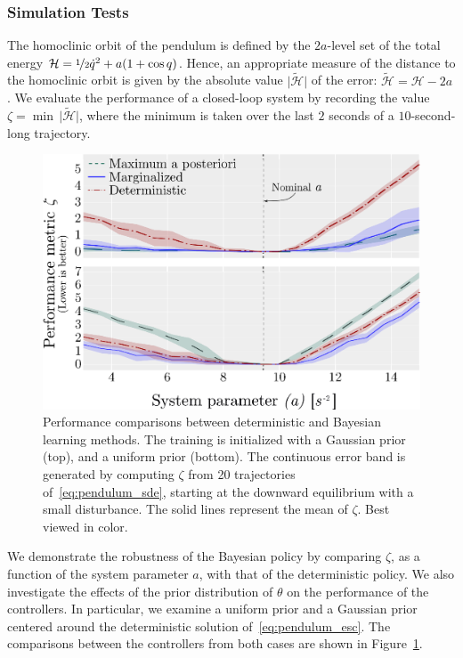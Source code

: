 \subsubsection{Simulation Tests} 
The homoclinic orbit of the pendulum is defined by the $2a$-level set of the
total energy $\mathcal{H} = \nicefrac{1}{2}\dot{q}^2 + a(1 +
\cos{q})$. Hence, an appropriate measure of the distance to the
homoclinic orbit is given by the absolute value $\bigl| \mathcal{\tilde{H}}
\bigr|$ of the error: $\mathcal{\tilde{H}} = \mathcal{H} - 2a$. We evaluate the
performance of a closed-loop system by recording the value $\zeta = \min \,
\bigl| \mathcal{\tilde{H}} \bigr|$, where the minimum is taken over the last $2$
seconds of a $10$-second-long trajectory.
\begin{figure}[tb]
    \centering
    \includegraphics[width=0.8\linewidth]{figures/H_combined.eps}
    \caption{
        Performance comparisons between deterministic and Bayesian learning
        methods. 
        The training is initialized with a Gaussian prior (top), and a
        uniform prior (bottom). 
        The continuous error band is generated by computing $\zeta$ from 20
        trajectories of~\eqref{eq:pendulum_sde}, starting at the downward
        equilibrium with a small disturbance. 
        The solid lines represent the mean of $\zeta$. 
        Best viewed in color.
    }
    \label{fig:bayes_compare}
\end{figure}

We demonstrate the robustness of the Bayesian policy by comparing $\zeta$,
as a function of the system parameter $a$, with that of the deterministic
policy.
%
We also investigate the effects of the prior distribution of $\theta$ on the
performance of the controllers.
%
In particular, we examine a uniform prior and a Gaussian prior centered around
the deterministic solution of~\eqref{eq:pendulum_esc}.
%
The comparisons between the controllers from both cases are shown in
Figure~\ref{fig:bayes_compare}.
%

